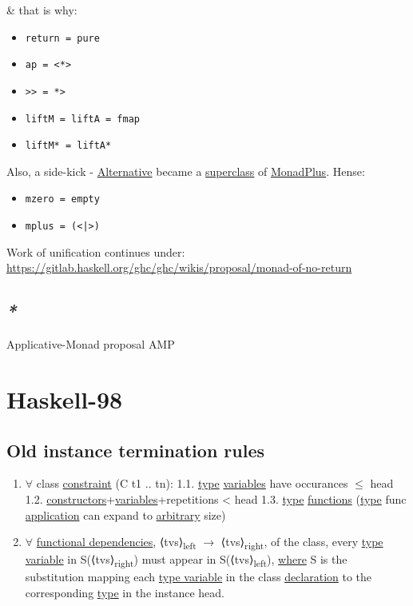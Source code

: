 \documentclass[a4paper,14pt,oneside]{book}
\begin{document}
\& that is why:
\begin{itemize}
\item \texttt{return = pure}
\item \texttt{ap = <*>}
\item \texttt{>> = *>}
\item \texttt{liftM = liftA = fmap}
\item \texttt{liftM* = liftA*}
\end{itemize}

Also, a side-kick - \hyperref[orgbbe4976]{Alternative} became a \hyperref[org484135b]{superclass} of \hyperref[orgcbc22af]{MonadPlus}. Hense:
\begin{itemize}
\item \texttt{mzero = empty}
\item \texttt{mplus = (<|>)}
\end{itemize}

Work of unification continues under: \url{https://gitlab.haskell.org/ghc/ghc/wikis/proposal/monad-of-no-return}

\section{\emph{*}}
\label{sec:org69cec8b}

\label{org8a472ad}Applicative-Monad proposal
\label{orgd8bc171}AMP

\chapter{Haskell-98}
\label{sec:org8266a56}

\section{\label{org585901a}Old instance termination rules}
\label{sec:org5196625}

\begin{enumerate}
\item \(\forall\) class \hyperref[org6e394a5]{constraint} (C t1 .. tn):
1.1. \hyperref[org84bd6a1]{type} \hyperref[org201495c]{variables} have occurances \(\le\) head
1.2. \hyperref[orgca358f3]{constructors}+\hyperref[org201495c]{variables}+repetitions < head
1.3. \textlnot{} \hyperref[org84bd6a1]{type} \hyperref[org9374537]{functions} (\hyperref[org84bd6a1]{type} func \hyperref[orgfc6da2c]{application} can expand to \hyperref[org2463260]{arbitrary} size)
\item \(\forall\) \hyperref[org9c60050]{functional dependencies}, ⟨tvs⟩\textsubscript{left} \(\to\) ⟨tvs⟩\textsubscript{right}, of the class, every \hyperref[org379ef1b]{type variable} in S(⟨tvs⟩\textsubscript{right}) must appear in S(⟨tvs⟩\textsubscript{left}), \hyperref[org6d3bffe]{where} S is the substitution mapping each \hyperref[org379ef1b]{type variable} in the class \hyperref[org08c8373]{declaration} to the corresponding \hyperref[org84bd6a1]{type} in the instance head.
\end{enumerate}
\end{document}
